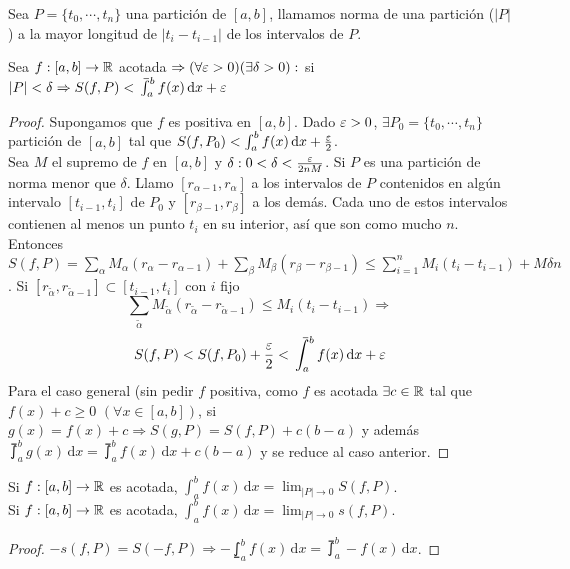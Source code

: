 \begin{definition}
  Sea $P = \{t_0, \cdots, t_n\}$ una partición de $[a, b]$, llamamos norma de una partición ($|P|$) a la mayor longitud de $|t_i - t_{i-1}|$  de los intervalos de $P$.
\end{definition}

\begin{theorem}
  Sea $f: [a, b] \to \mathbb{R}$ acotada $\Rightarrow (\forall \varepsilon > 0)(\exists \delta > 0) : $ si $|P| < \delta \Rightarrow S(f, P) < \upint_a^b f(x) \, \mathrm{d}x + \e$ 
  \begin{proof}
    Supongamos que $f$ es positiva en $[a, b]$. Dado $\varepsilon > 0$, $\exists P_0 = \{t_0, \cdots, t_n\}$ partición de $[a, b]$ tal que $S(f, P_0) < \int_a^b f(x) \, \mathrm{d}x + \frac{\varepsilon}{2}$. \\
    Sea $M$ el supremo de $f$ en $[a, b]$ y $\delta : 0 < \delta < \frac{\varepsilon}{2nM}$. Si $P$ es una partición de norma menor que $\delta$. Llamo $[r_{\alpha - 1}, r_{\alpha}]$ a los intervalos de $P$ contenidos en algún intervalo $[t_{i-1}, t_i]$ de $P_0$ y $[r_{\beta - 1}, r_{\beta}]$ a los demás. Cada uno de estos intervalos contienen al menos un punto $t_i$ en su interior, así que son como mucho $n$. Entonces $S(f, P) = \sum_{\alpha} M_{\alpha} (r_{\alpha} - r_{\alpha - 1}) + \sum_{\beta} M_{\beta} (r_{\beta} - r_{\beta - 1}) \leq \sum_{i = 1}^n M_i (t_i - t_{i-1}) + M \delta n$.
    Si $[r_{\tilde{\alpha}}, r_{\tilde{\alpha}-1}] \subset [t_{i-1}, t_i]$ con $i$ fijo \begin{equation}
      \sum_{\tilde{\alpha}} M_{\tilde{\alpha}} (r_{\tilde{\alpha}} - r_{\tilde{\alpha}-1}) \leq M_i (t_i - t_{i-1}) \Rightarrow
    \end{equation}
    \begin{equation}
      S(f, P) < S(f, P_0) + \frac{\e}{2} < \upint_a^b f(x) \, \mathrm{d}x + \e
    \end{equation}
    Para el caso general (sin pedir $f$ positiva, como $f$ es acotada $\exists c \in \mathbb{R}$ tal que $f(x) + c \geq 0$ $(\forall x \in [a, b])$, si $g(x) = f(x) + c \Rightarrow S(g, P) = S(f, P) + c (b-a)$ y además $\upint_a^b g(x) \, \mathrm{d}x = \upint_a^b f(x) \, \mathrm{d}x + c (b-a)$ y se reduce al caso anterior.
  \end{proof}
\end{theorem}


\begin{corollary}
  Si $f: [a, b] \to \mathbb{R}$ es acotada, $\int_a^b f(x) \, \mathrm{d}x = \lim_{|P| \to 0} S(f, P)$. \\
  Si $f: [a, b] \to \mathbb{R}$ es acotada, $\int_a^b f(x) \, \mathrm{d}x = \lim_{|P| \to 0} s(f, P)$. 
  \begin{proof}
    $-s(f, P) = S(-f, P) \Rightarrow - \lowint_a^b f(x)\, \mathrm{d}x = \upint_a^b -f(x) \, \mathrm{d}x$.
  \end{proof}
\end{corollary}

